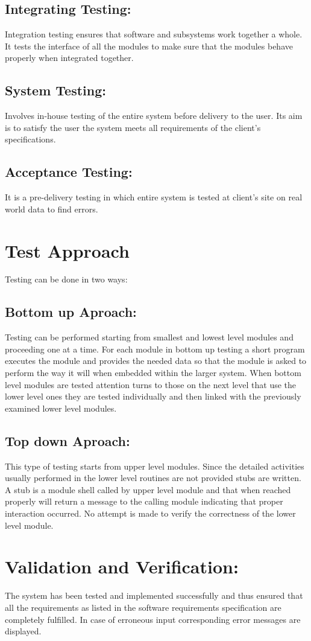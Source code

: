 \subsection{Integrating Testing:}
Integration testing ensures that software and subsystems work together a whole. It tests the
interface of all the modules to make sure that the modules behave properly when integrated
together.
\subsection{System Testing:}
Involves in-house testing of the entire system before delivery to the user. Its aim is to satisfy
the user the system meets all requirements of the client's specifications.
\subsection{Acceptance Testing:}
It is a pre-delivery testing in which entire system is tested at client's site on real world data
to find errors.
\section{Test Approach}
Testing can be done in two ways:
\subsection{Bottom up Aproach:}
Testing can be performed starting from smallest and lowest level modules and proceeding one at a time. For each module in bottom up testing a short program executes the module and provides the needed data so that the module is asked to perform the way it will when embedded within the larger system. When bottom level modules are tested attention turns to those on the next level that use the lower level ones they are tested individually and then linked with the previously examined lower level modules.
\subsection{Top down Aproach:}
This type of testing starts from upper level modules. Since the detailed activities usually performed in the lower level routines are not provided stubs are written. A stub is a module shell called by upper level module and that when reached properly will return a message to the calling module indicating that proper interaction occurred. No attempt is made to verify the correctness of the lower level module.
\section{Validation and Verification:}
The system has been tested and implemented successfully and thus ensured that all the requirements as listed in the software requirements specification are completely fulfilled. In case of erroneous input corresponding error messages are displayed.

